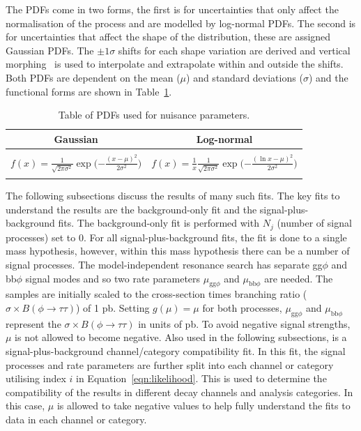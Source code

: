 The \ac{PDF}s come in two forms, the first is for uncertainties that only affect the normalisation of the process and are modelled by log-normal \ac{PDF}s. 
The second is for uncertainties that affect the shape of the distribution, these are assigned Gaussian \ac{PDF}s.
The $\pm1\sigma$ shifts for each shape variation are derived and vertical morphing~\cite{Conway:2011in} is used to interpolate and extrapolate within and outside the shifts.
Both \ac{PDF}s are dependent on the mean ($\mu$) and standard deviations ($\sigma$) and the functional forms are shown in Table~\ref{tab:pdfs}. \\

\begin{table}[!hbtp]
    \centering
    \begin{tabular}{|c|c|}
         \hline
         Gaussian & Log-normal  \\
         \hline
         \hline
          & \\
         $f(x) = \frac{1}{\sqrt{2\pi\sigma^{2}}} \exp\Big({-\frac{(x - \mu)^2}{2\sigma^2}}\Big)$ & $f(x) = \frac{1}{x} \frac{1}{\sqrt{2\pi\sigma^{2}}} \exp\Big({-\frac{(\ln x - \mu)^2}{2\sigma^2}}\Big)$ \\
          & \\
         \hline
    \end{tabular}
    \caption[PDFs used for nuisance parameters.]{Table of PDFs used for nuisance parameters.}
    \label{tab:pdfs}
\end{table}

The following subsections discuss the results of many such fits.
The key fits to understand the results are the background-only fit and the signal-plus-background fits.
The background-only fit is performed with $N_j$ (number of signal processes) set to 0.
For all signal-plus-background fits, the fit is done to a single mass hypothesis, however, within this mass hypothesis there can be a number of signal processes.
The model-independent resonance search has separate gg$\phi$ and bb$\phi$ signal modes and so two rate parameters $\mu_{\text{gg}\phi}$ and $\mu_{\text{bb}\phi}$ are needed.
The samples are initially scaled to the cross-section times branching ratio ($\sigma \times B (\phi\rightarrow\tau\tau)$) of 1 pb.
Setting $g(\mu)=\mu$ for both processes, $\mu_{\text{gg}\phi}$ and $\mu_{\text{bb}\phi}$ represent the $\sigma \times B (\phi\rightarrow\tau\tau)$ in units of pb.
To avoid negative signal strengths, $\mu$ is not allowed to become negative.
Also used in the following subsections, is a signal-plus-background channel/category compatibility fit.
In this fit, the signal processes and rate parameters are further split into each channel or category utilising index $i$ in Equation~\ref{eqn:likelihood}.
This is used to determine the compatibility of the results in different decay channels and analysis categories.
In this case, $\mu$ is allowed to take negative values to help fully understand the fits to data in each channel or category. \\

